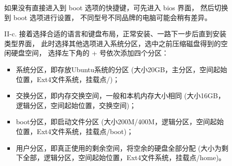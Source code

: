 \begin{itemize}
\begin{itemize}
\begin{figure}[htbp]
{					}
					\hfill
					\label{fig:UbuntuInstall}
				\end{figure}
			
				如果没有直接进入到 boot 选项的快捷键，可先进入 bios 界面，
				然后切换到 boot 选项进行设置，
				不同型号不同品牌的电脑可能会稍有差异。
			\item [II-c.] 接着选择合适的语言和键盘布局，正常安装、一路下一步后直到安装类型界面，
				此时选择其他选项进入系统分区，选中之前压缩磁盘得到的空闲硬盘空间，
				选择左下角的 + 号依次添加四个分区：
				\begin{itemize}
					\item 系统分区，即存放Ubuntu系统的分区
					(大小20GB，主分区，空间起始位置，Ext4文件系统，挂载点/)；
					\item 交换分区，即内存交换空间，一般和本机内存大小相同
					(大小16GB，逻辑分区，空间起始位置，交换空间)；
					\item boot分区，即启动文件分区
					(大小200M/400M，逻辑分区，空间起始位置，Ext4文件系统，挂载点/boot)；
					\item 用户分区，即真正使用的剩余空间，将空余的硬盘全部分配
					(大小为剩下全部，逻辑分区，空间起始位置，Ext4文件系统，挂载点/home)。
				\end{itemize}
				\begin{figure}[htbp]
					\centering
					\hfill
\end{figure}
\end{itemize}
\end{itemize}
